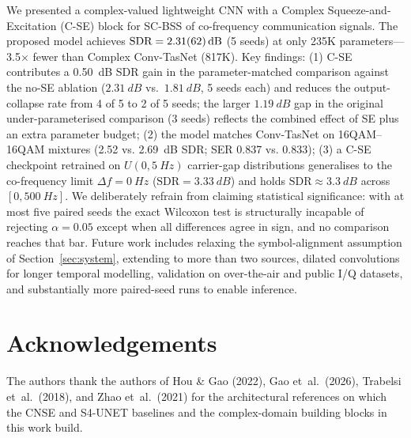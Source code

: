 \documentclass[twocolumn,english]{svjour3}
\begin{document}
We presented a complex-valued lightweight CNN with a Complex Squeeze-and-Excitation (C-SE) block for SC-BSS of co-frequency communication signals. The proposed model achieves $\text{SDR}=\SI{2.31 \pm 0.62}{dB}$ (5 seeds) at only 235K parameters---3.5$\times$ fewer than Complex Conv-TasNet (817K). Key findings: (1) C-SE contributes a \SI{0.50}{dB} SDR gain in the parameter-matched comparison against the no-SE ablation ($\SI{2.31}{dB}$ vs.\ $\SI{1.81}{dB}$, 5 seeds each) and reduces the output-collapse rate from 4 of 5 to 2 of 5 seeds; the larger $\SI{1.19}{dB}$ gap in the original under-parameterised comparison (3 seeds) reflects the combined effect of SE plus an extra parameter budget; (2) the model matches Conv-TasNet on 16QAM--16QAM mixtures (\num{2.52} vs. \num{2.69}~dB SDR; SER \num{0.837} vs. \num{0.833}); (3) a C-SE checkpoint retrained on $U(0, \SI{5}{Hz})$ carrier-gap distributions generalises to the co-frequency limit $\Delta f=\SI{0}{Hz}$ ($\text{SDR}=\SI{3.33}{dB}$) and holds $\text{SDR}\approx\SI{3.3}{dB}$ across $[0, \SI{500}{Hz}]$. We deliberately refrain from claiming statistical significance: with at most five paired seeds the exact Wilcoxon test is structurally incapable of rejecting $\alpha=0.05$ except when all differences agree in sign, and no comparison reaches that bar. Future work includes relaxing the symbol-alignment assumption of Section~\ref{sec:system}, extending to more than two sources, dilated convolutions for longer temporal modelling, validation on over-the-air and public I/Q datasets, and substantially more paired-seed runs to enable inference.

\section*{Acknowledgements}

The authors thank the authors of Hou \& Gao (2022), Gao et~al.\ (2026), Trabelsi et~al.\ (2018), and Zhao et~al.\ (2021) for the architectural references on which the CNSE and S4-UNET baselines and the complex-domain building blocks in this work build.
\end{document}
